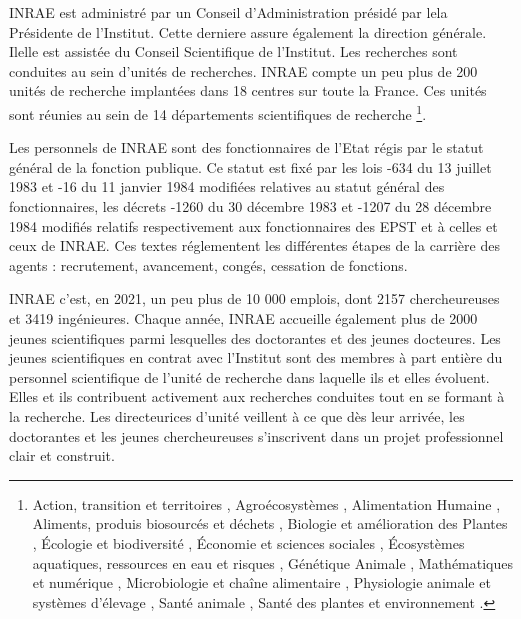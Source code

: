 INRAE est administr\'e par un Conseil d'Administration pr\'esid\'e par le\mp la Pr\'esident\mp e de l'Institut. Ce\mp tte dernier\mp e assure \'egalement la direction g\'en\'erale. Il\mp elle est assist\'e\mp e du Conseil Scientifique de l'Institut. Les recherches sont conduites au sein d'unit\'es de recherches. INRAE compte un peu plus de 200 unit\'es de recherche implant\'ees dans 18 centres sur toute la France. Ces unit\'es sont r\'eunies au sein de 14 d\'epartements scientifiques de recherche \footnote{
\og Action, transition et territoires \fg{},
\og  Agro\'ecosyst\`emes \fg{},
\og  Alimentation Humaine \fg{},
\og  Aliments, produis biosourc\'es et d\'echets \fg{},
\og  Biologie et am\'elioration des Plantes \fg{},
\og  \'Ecologie et biodiversit\'e \fg{},
\og  \'Economie et sciences sociales \fg{},
\og  \'Ecosyst\`emes aquatiques, ressources en eau et risques \fg{},
\og  G\'en\'etique Animale \fg{},
\og  Math\'ematiques et num\'erique \fg{},
\og  Microbiologie et cha\^ine alimentaire \fg{},
\og  Physiologie animale et syst\`emes d'\'elevage \fg{},
\og  Sant\'e animale \fg{},
\og  Sant\'e des plantes et environnement \fg{}.
}.

Les personnels de INRAE sont des fonctionnaires de l'Etat r\'egis par le statut g\'en\'eral de la fonction publique. Ce statut est fix\'e par les lois -634 du 13 juillet 1983 et -16 du 11 janvier 1984 modifi\'ees relatives au statut g\'en\'eral des fonctionnaires, les d\'ecrets -1260 du 30 d\'ecembre 1983 et -1207 du 28 d\'ecembre 1984 modifi\'es relatifs respectivement aux fonctionnaires des EPST et \`a celles et ceux de INRAE. Ces textes r\'eglementent les diff\'erentes \'etapes de la carri\`ere des agents : recrutement, avancement, cong\'es, cessation de fonctions.

INRAE c'est, en 2021, un peu plus de 10 000 emplois, dont 2157 chercheur\mp euse\mp s et 3419 ing\'enieur\mp e\mp s. Chaque ann\'ee, INRAE accueille \'egalement plus de 2000 jeunes scientifiques parmi lesquel\mp le\mp s des doctorant\mp e\mp s et des jeunes docteur\mp e\mp s. Les jeunes scientifiques en contrat avec l'Institut sont des membres \`a part enti\`ere du personnel scientifique de l'unit\'e de recherche dans laquelle ils et elles \'evoluent. Elles et ils contribuent activement aux recherches conduites tout en se formant \`a la recherche. Les directeur\mp ices d'unit\'e veillent \`a ce que d\`es leur arriv\'ee, les doctorant\mp e\mp s et les jeunes chercheur\mp euse\mp s s'inscrivent dans un projet professionnel clair et construit.

